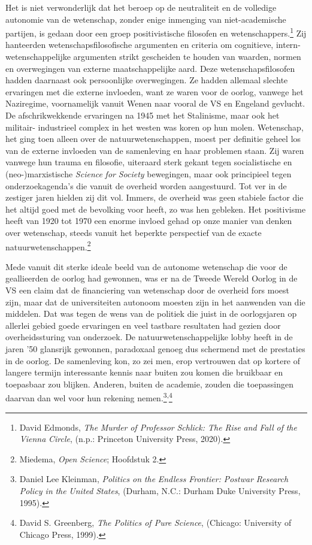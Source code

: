 \documentclass[smallauthor, chapterhaspagenum, nochapterinheader, pagenuminheader,  bigchapnum,medium2, tocpages,  garamond, titleinheader]{jote-book}
\begin{document}
	Het is niet verwonderlijk dat het beroep op de neutraliteit en de volledige autonomie van de wetenschap, zonder enige inmenging van niet-academische partijen, is gedaan door een groep positivistische filosofen en wetenschappers.\footnote{David Edmonds, \emph{The }\emph{Murder}\emph{ of Professor }\emph{Schlick}\emph{: The Rise }\emph{and}\emph{ }\emph{Fall}\emph{ of }\emph{the}\emph{ Vienna }\emph{Circle},\emph{ }(n.p.: Princeton University Press, 2020).} Zij hanteerden wetenschapsfilosofische argumenten en criteria om cognitieve, intern-wetenschappelijke argumenten strikt gescheiden te houden van waarden, normen en overwegingen van externe maatschappelijke aard. Deze wetenschapsfilosofen hadden daarnaast ook persoonlijke overwegingen. Ze hadden allemaal slechte ervaringen met die externe invloeden, want ze waren voor de oorlog, vanwege het Naziregime, voornamelijk vanuit Wenen naar vooral de VS en Engeland gevlucht. De afschrikwekkende ervaringen na 1945 met het Stalinisme, maar ook het militair- industrieel complex in het westen was koren op hun molen. Wetenschap, het ging toen alleen over de natuurwetenschappen, moest per definitie geheel los van de externe invloeden van de samenleving en haar problemen staan. Zij waren vanwege hun trauma en filosofie, uiteraard sterk gekant tegen socialistische en (neo-)marxistische \emph{Science}\emph{ }\emph{for}\emph{ Society} bewegingen, maar ook principieel tegen onderzoekagenda's die vanuit de overheid worden aangestuurd. Tot ver in de zestiger jaren hielden zij dit vol. Immers, de overheid was geen stabiele factor die het altijd goed met de bevolking voor heeft, zo was hen gebleken. Het positivisme heeft van 1920 tot 1970 een enorme invloed gehad op onze manier van denken over wetenschap, steeds vanuit het beperkte perspectief van de exacte natuurwetenschappen.\footnote{Miedema, \emph{Open }\emph{Science}; Hoofdstuk 2. }



	Mede vanuit dit sterke ideale beeld van de autonome wetenschap die voor de geallieerden de oorlog had gewonnen, was er na de Tweede Wereld Oorlog in de VS een claim dat de financiering van wetenschap door de overheid fors moest zijn, maar dat de universiteiten autonoom moesten zijn in het aanwenden van die middelen. Dat was tegen de wens van de politiek die juist in de oorlogsjaren op allerlei gebied goede ervaringen en veel tastbare resultaten had gezien door overheidssturing van onderzoek. De natuurwetenschappelijke lobby heeft in de jaren '50 glansrijk gewonnen, paradoxaal genoeg dus schermend met de prestaties in de oorlog. De samenleving kon, zo zei men, erop vertrouwen dat op kortere of langere termijn interessante kennis naar buiten zou komen die bruikbaar en toepasbaar zou blijken. Anderen, buiten de academie, zouden die toepassingen daarvan dan wel voor hun rekening nemen.\footnote{Daniel Lee Kleinman, \emph{Politics on }\emph{the}\emph{ }\emph{Endless}\emph{ Frontier: }\emph{Postwar}\emph{ Research Policy in }\emph{the}\emph{ United }\emph{States},\emph{ }(Durham, N.C.: Durham Duke University Press, 1995).}\textsuperscript{,}\footnote{David S. Greenberg, \emph{The Politics of Pure }\emph{Science},\emph{ }(Chicago: University of Chicago Press, 1999).}
\end{document}
